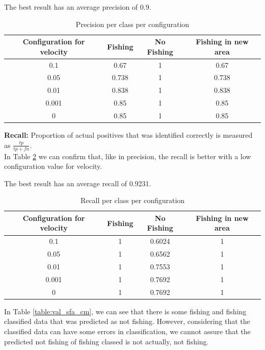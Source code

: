 The best result has an average precision of 0.9.


\begin {table}[H]
\begin{center}
\begin{tabular}{c|c|c|c}
Configuration for velocity & \textbf{Fishing} & \textbf{No Fishing} & \textbf{Fishing in new area} \\\hline
0.1 & 0.67 & 1 & 0.67 \\
0.05 & 0.738 & 1 & 0.738 \\
0.01 & 0.838 & 1 & 0.838 \\
0.001 & 0.85 & 1 & 0.85 \\
0 & 0.85 & 1 & 0.85 
\label{table:val_sfa_pr}
\end{tabular}
\caption {Precision per class per configuration}
\end{center}
\end {table}


\textbf{Recall:} Proportion of actual positives that was identified correctly is measured as \(\frac{tp}{tp+fn} \). \\
In Table \ref{table:val_sfa_re} we can confirm that, like in precision, the recall is better with a low configuration value for velocity.

The best result has an average recall of 0.9231.

\begin {table}[H]
\begin{center}
\begin{tabular}{c|c|c|c}
Configuration for velocity & \textbf{Fishing} & \textbf{No Fishing} & \textbf{Fishing in new area} \\\hline
0.1 & 1 & 0.6024 & 1 \\
0.05 & 1 & 0.6562 & 1 \\
0.01 & 1 & 0.7553 & 1 \\
0.001 &1 & 0.7692 & 1 \\
0 &1 & 0.7692 & 1
\label{table:val_sfa_re}
\end{tabular}
\caption {Recall per class per configuration}
\end{center}
\end {table}

In Table \ref{table:val_sfa_cm}, we can see that there is some fishing and fishing classified data that was predicted as not fishing. However, considering that the classified data can have some errors in classification, we cannot assure that the predicted not fishing of fishing classed is not actually, not fishing. 

